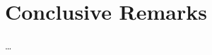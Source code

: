 \documentclass[12pt,a4paper]{article}
\numberwithin{theorem}{section}
\numberwithin{definition}{section}
\numberwithin{example}{section}
\numberwithin{exercise}{section}
\begin{document}
\newpage



\newpage



\newpage



\newpage

\section{Conclusive Remarks}

\dots

\newpage

\nocite{*}
\printbibliography[]

\newpage


\end{document}
